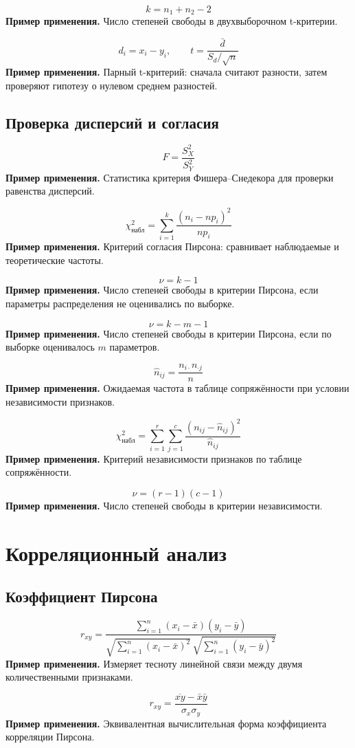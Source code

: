 \documentclass[a4paper,14pt]{extarticle}
\newcommand{\FormulaNote}[2]{%
  \begin{equation*}
  #1
  \end{equation*}
  \noindent\textbf{Пример применения.} #2\par\medskip
}
\begin{document}
\FormulaNote{k=n_1+n_2-2}{Число степеней свободы в двухвыборочном t-критерии.}

\FormulaNote{d_i=x_i-y_i,\qquad t=\frac{\bar{d}}{S_d/\sqrt{n}}}{Парный t-критерий: сначала считают разности, затем проверяют гипотезу о нулевом среднем разностей.}

\subsection{Проверка дисперсий и согласия}

\FormulaNote{F=\frac{S_X^2}{S_Y^2}}{Статистика критерия Фишера--Снедекора для проверки равенства дисперсий.}

\FormulaNote{\chi^2_{\text{набл}}=\sum_{i=1}^{k}\frac{(n_i-np_i)^2}{np_i}}{Критерий согласия Пирсона: сравнивает наблюдаемые и теоретические частоты.}

\FormulaNote{\nu=k-1}{Число степеней свободы в критерии Пирсона, если параметры распределения не оценивались по выборке.}

\FormulaNote{\nu=k-m-1}{Число степеней свободы в критерии Пирсона, если по выборке оценивалось $m$ параметров.}

\FormulaNote{\hat{n}_{ij}=\frac{n_{i\cdot}n_{\cdot j}}{n}}{Ожидаемая частота в таблице сопряжённости при условии независимости признаков.}

\FormulaNote{\chi^2_{\text{набл}}=\sum_{i=1}^{r}\sum_{j=1}^{c}\frac{(n_{ij}-\hat{n}_{ij})^2}{\hat{n}_{ij}}}{Критерий независимости признаков по таблице сопряжённости.}

\FormulaNote{\nu=(r-1)(c-1)}{Число степеней свободы в критерии независимости.}

\section{Корреляционный анализ}

\subsection{Коэффициент Пирсона}

\FormulaNote{
r_{xy}=
\frac{\sum_{i=1}^{n}(x_i-\bar{x})(y_i-\bar{y})}
{\sqrt{\sum_{i=1}^{n}(x_i-\bar{x})^2}\,\sqrt{\sum_{i=1}^{n}(y_i-\bar{y})^2}}
}{Измеряет тесноту линейной связи между двумя количественными признаками.}

\FormulaNote{r_{xy}=\frac{\overline{xy}-\bar{x}\bar{y}}{\sigma_x\sigma_y}}{Эквивалентная вычислительная форма коэффициента корреляции Пирсона.}
\end{document}
